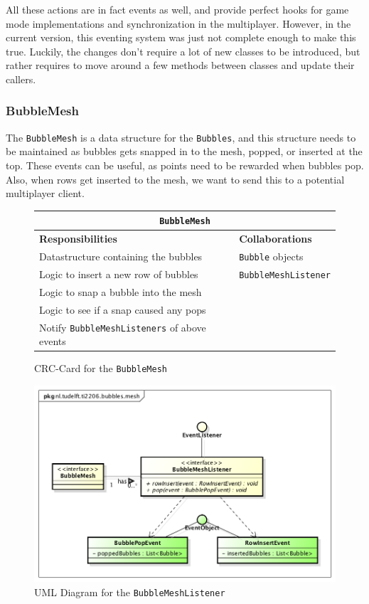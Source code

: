 \documentclass[a4paper]{article}
\begin{document}
\par All these actions are in fact events as well, and provide perfect hooks for game mode implementations and  synchronization in the multiplayer. However, in the current version, this eventing system was just not complete enough to make this true. Luckily, the changes don't require a lot of new classes to be introduced, but rather requires to move around a few methods between classes and update their callers.

\subsubsection*{BubbleMesh}
The \texttt{BubbleMesh} is a data structure for the \texttt{Bubbles}, and this structure needs to be maintained as bubbles gets snapped in to the mesh, popped, or inserted at the top. These events can be useful, as points need to be rewarded when bubbles pop. Also, when rows get inserted to the mesh, we want to send this to a potential multiplayer client.

\begin{figure}[H]
    \begin{center}
    \begin{tabular}{ | p{8cm} | p{4cm} | }
      \multicolumn{2}{c}{\texttt{BubbleMesh}} \\ \hline
      \textbf{Responsibilities} & \textbf{Collaborations} \\ \hline
      Datastructure containing the bubbles & \texttt{Bubble} objects \\
      Logic to insert a new row of bubbles & \texttt{BubbleMeshListener} \\
      Logic to snap a bubble into the mesh & \\
      Logic to see if a snap caused any pops & \\
      Notify \texttt{BubbleMeshListeners} of above events & \\
      \hline
    \end{tabular}
    \end{center}
    \caption{CRC-Card for the \texttt{BubbleMesh}}
\end{figure}

\begin{figure}[H]
    \centering
    \includegraphics[scale=0.5]{BubbleMeshListener.png}
    \caption{UML Diagram for the \texttt{BubbleMeshListener}}
\end{figure}
\end{document}
